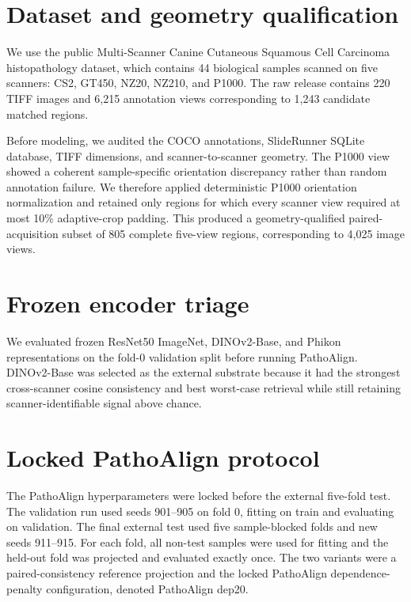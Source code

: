 \documentclass[11pt]{article}
\begin{document}
\section{Dataset and geometry qualification}

We use the public Multi-Scanner Canine Cutaneous Squamous Cell Carcinoma histopathology dataset, which contains 44 biological samples scanned on five scanners: CS2, GT450, NZ20, NZ210, and P1000. The raw release contains 220 TIFF images and 6,215 annotation views corresponding to 1,243 candidate matched regions.

Before modeling, we audited the COCO annotations, SlideRunner SQLite database, TIFF dimensions, and scanner-to-scanner geometry. The P1000 view showed a coherent sample-specific orientation discrepancy rather than random annotation failure. We therefore applied deterministic P1000 orientation normalization and retained only regions for which every scanner view required at most 10\% adaptive-crop padding. This produced a geometry-qualified paired-acquisition subset of 805 complete five-view regions, corresponding to 4,025 image views.

\section{Frozen encoder triage}

We evaluated frozen ResNet50 ImageNet, DINOv2-Base, and Phikon representations on the fold-0 validation split before running PathoAlign. DINOv2-Base was selected as the external substrate because it had the strongest cross-scanner cosine consistency and best worst-case retrieval while still retaining scanner-identifiable signal above chance.

\begin{table}[ht]
\centering
\caption{Frozen encoder triage on fold-0 validation.}
\label{tab:encoder-triage}

\end{table}

\section{Locked PathoAlign protocol}

The PathoAlign hyperparameters were locked before the external five-fold test. The validation run used seeds 901--905 on fold 0, fitting on train and evaluating on validation. The final external test used five sample-blocked folds and new seeds 911--915. For each fold, all non-test samples were used for fitting and the held-out fold was projected and evaluated exactly once. The two variants were a paired-consistency reference projection and the locked PathoAlign dependence-penalty configuration, denoted PathoAlign dep20.
\end{document}
